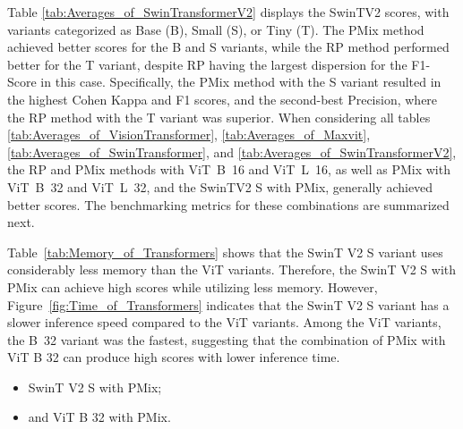Table \ref{tab:Averages_of_SwinTransformerV2} displays the \gls{SwinTV2} scores, with variants categorized as Base (B), Small (S), or Tiny (T). The \gls{PMix} method achieved better scores for the B and S variants, while the \gls{RP} method performed better for the T variant, despite \gls{RP} having the largest dispersion for the F1-Score in this case. Specifically, the \gls{PMix} method with the S variant resulted in the highest Cohen Kappa and F1 scores, and the second-best Precision, where the \gls{RP} method with the T variant was superior.
When considering all tables \ref{tab:Averages_of_VisionTransformer}, \ref{tab:Averages_of_Maxvit}, \ref{tab:Averages_of_SwinTransformer}, and \ref{tab:Averages_of_SwinTransformerV2}, the \gls{RP} and \gls{PMix} methods with \mbox{\gls{ViT} B 16} and \mbox{\gls{ViT} L 16}, as well as \gls{PMix} with \mbox{\gls{ViT} B 32} and \mbox{\gls{ViT} L 32}, and the \gls{SwinTV2} S with \gls{PMix}, generally achieved better scores. The benchmarking metrics for these combinations are summarized next.

Table~\ref{tab:Memory_of_Transformers} shows that the \gls{SwinT} V2 S variant uses considerably less memory than the \gls{ViT} variants. Therefore, the \gls{SwinT} V2 S with \gls{PMix} can achieve high scores while utilizing less memory. However, Figure~\ref{fig:Time_of_Transformers} indicates that the \gls{SwinT} V2 S variant has a slower inference speed compared to the \gls{ViT} variants. Among the \gls{ViT} variants, the \mbox{B 32} variant was the fastest, suggesting that the combination of \gls{PMix} with \gls{ViT} B 32 can produce high scores with lower inference time.  
\begin{itemize}
	\item \gls{SwinT} V2 S with \gls{PMix};
	\item and \gls{ViT} B 32 with \gls{PMix}. 
\end{itemize}

